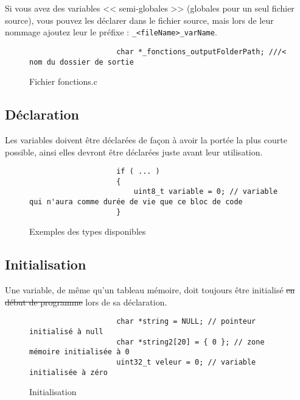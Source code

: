 			Si vous avez des variables << semi-globales >> (globales pour un seul fichier source), vous pouvez les déclarer dans le fichier source, mais lors de leur nommage ajoutez leur le préfixe : \verb+_<fileName>_varName+.

			\begin{figure}[H]
				\begin{changemargin}{-2.5cm}{-2.5cm}
				\begin{tcolorbox}
				\begin{verbatim}
					char *_fonctions_outputFolderPath; ///< nom du dossier de sortie
				\end{verbatim}
				\end{tcolorbox}
				\end{changemargin}
				\caption{Fichier fonctions.c}
			\end{figure}

		\subsection{Déclaration}
			Les variables doivent être déclarées de façon à avoir la portée la plus courte possible, ainsi elles devront être déclarées juste avant leur utilisation.

			\begin{figure}[H]
				\begin{changemargin}{-2.5cm}{-2.5cm}
				\begin{tcolorbox}
				\begin{verbatim}
					if ( ... )
					{
					    uint8_t variable = 0; // variable qui n'aura comme durée de vie que ce bloc de code
					}
				\end{verbatim}
				\end{tcolorbox}
				\end{changemargin}
				\caption{Exemples des types disponibles}
			\end{figure}

		\subsection{Initialisation}
			Une variable, de même qu'un tableau mémoire, doit toujours être initialisé \sout{en début de programme} lors de sa déclaration.
			
			\begin{figure}[H]
				\begin{changemargin}{-2.5cm}{-2.5cm}
				\begin{tcolorbox}
				\begin{verbatim}
					char *string = NULL; // pointeur initialisé à null
					char *string2[20] = { 0 }; // zone mémoire initialisée à 0
					uint32_t veleur = 0; // variable initialisée à zéro
				\end{verbatim}
				\end{tcolorbox}
				\end{changemargin}
				\caption{Initialisation}
			\end{figure}

